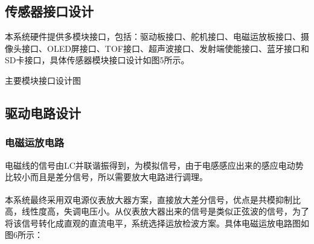 \documentclass{article}%
\begin{document}
\begin{multicols}{2}
		\subsection{传感器接口设计}
		本系统硬件提供多模块接口，包括：驱动板接口、舵机接口、电磁运放板接口、摄像头接口、OLED屏接口、TOF接口、超声波接口、发射端使能接口、蓝牙接口和SD卡接口，具体传感器模块接口设计如图5所示。
		\begin{center}
			\caption{主要模块接口设计图}		
		\end{center}
		
		\subsection{驱动电路设计}
		
		\subsubsection{电磁运放电路}
		
		电磁线的信号由LC并联谐振得到，为模拟信号，由于电感感应出来的感应电动势比较小而且是差分信号，所以需要放大电路进行调理。
		
		本系统最终采用双电源仪表放大器\textsuperscript{\cite{ref3}}方案，直接放大差分信号，优点是共模抑制比高，线性度高，失调电压小。从仪表放大器出来的信号是类似正弦波的信号，为了将该信号转化成直观的直流电平，系统选择运放检波方案。具体电磁运放电路图如图6所示：
		

\end{multicols}
\end{document}
